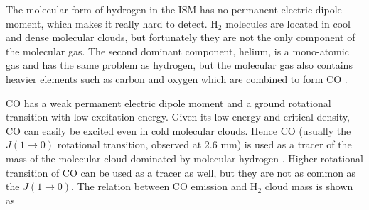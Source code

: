 \documentclass[useAMS,usenatbib]{mn2e}
\begin{document}

 The molecular form of hydrogen in the ISM has no permanent electric dipole moment, which makes it really hard to detect. H$_2$ molecules are located in cool and dense molecular clouds, but fortunately they are not the only component of the molecular gas. The second dominant component, helium, is a mono-atomic gas and has the same problem as hydrogen, but the molecular gas also contains heavier elements such as carbon and oxygen which are combined to form CO \citep{Bolato13}.

CO has a weak permanent electric dipole moment and a ground rotational transition with low excitation energy. Given its low energy and critical density, CO can easily be excited even in cold molecular clouds. Hence CO (usually the $J(1\rightarrow 0)$ rotational transition, observed at 2.6 mm) is used as a tracer of the mass of the molecular cloud dominated by molecular hydrogen \citep[see, for example,][] {Sanders84}. Higher rotational transition of CO can be used as a tracer as well, but they are not as common as the $J(1\rightarrow 0)$. The relation between CO emission and H$_2$ cloud mass is shown as
\end{document}
